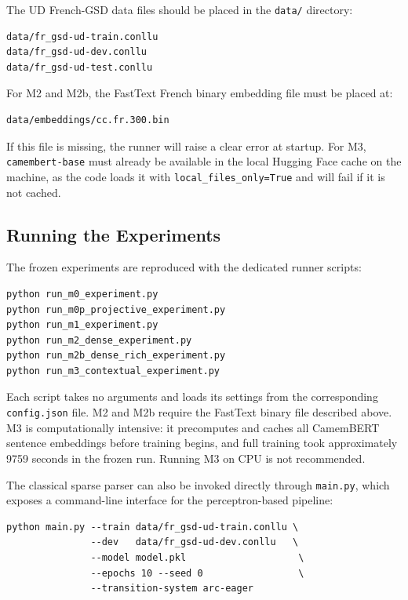 \documentclass[12pt,letterpaper]{article}
\begin{document}
The UD French-GSD data files should be placed in the \texttt{data/} directory:

\begin{verbatim}
data/fr_gsd-ud-train.conllu
data/fr_gsd-ud-dev.conllu
data/fr_gsd-ud-test.conllu
\end{verbatim}

For M2 and M2b, the FastText French binary embedding file must be placed at:

\begin{verbatim}
data/embeddings/cc.fr.300.bin
\end{verbatim}

If this file is missing, the runner will raise a clear error at startup. For M3, \texttt{camembert-base} must already be available in the local Hugging Face cache on the machine, as the code loads it with \texttt{local\_files\_only=True} and will fail if it is not cached.

\subsection{Running the Experiments}
\label{subsec:running_experiments}

The frozen experiments are reproduced with the dedicated runner scripts:

\begin{verbatim}
python run_m0_experiment.py
python run_m0p_projective_experiment.py
python run_m1_experiment.py
python run_m2_dense_experiment.py
python run_m2b_dense_rich_experiment.py
python run_m3_contextual_experiment.py
\end{verbatim}

Each script takes no arguments and loads its settings from the corresponding \texttt{config.json} file. M2 and M2b require the FastText binary file described above. M3 is computationally intensive: it precomputes and caches all CamemBERT sentence embeddings before training begins, and full training took approximately 9759 seconds in the frozen run. Running M3 on CPU is not recommended.

The classical sparse parser can also be invoked directly through \texttt{main.py}, which exposes a command-line interface for the perceptron-based pipeline:

\begin{verbatim}
python main.py --train data/fr_gsd-ud-train.conllu \
               --dev   data/fr_gsd-ud-dev.conllu   \
               --model model.pkl                    \
               --epochs 10 --seed 0                 \
               --transition-system arc-eager
\end{verbatim}
\end{document}
